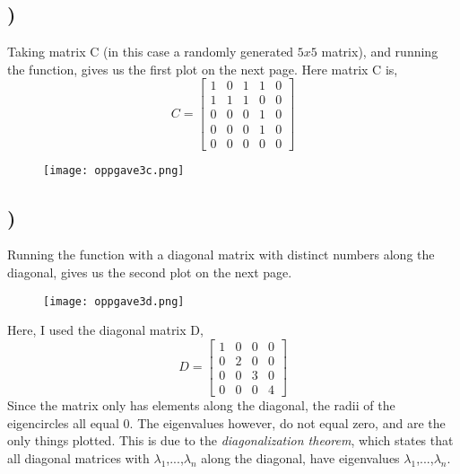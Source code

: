 \documentclass[a4paper,10pt,norsk]{article}
\begin{document}
\subsection{)}
Taking matrix C (in this case a randomly generated $5 x 5$ matrix), and running the function, gives us the first plot on the next page.
Here matrix C is,
\begin{equation}
    C =
    \begin{bmatrix}
    1 & 0 & 1 & 1 & 0\\
    1 & 1 & 1 & 0 & 0\\
    0 & 0 & 0 & 1 & 0\\
    0 & 0 & 0 & 1 & 0\\
    0 & 0 & 0 & 0 & 0
    \end{bmatrix}
\end{equation}

\begin{figure}[h!]
        \centering 
        \texttt{[image: oppgave3c.png]} 
\end{figure}

\subsection{)}
Running the function with a diagonal matrix with distinct numbers along the diagonal, gives us the second plot on the next page.

\begin{figure}[h!]
        \centering 
        \texttt{[image: oppgave3d.png]} 
\end{figure}

Here, I used the diagonal matrix D,
\begin{equation}
    D =
    \begin{bmatrix}
    1 & 0 & 0 & 0\\
    0 & 2 & 0 & 0\\
    0 & 0 & 3 & 0\\
    0 & 0 & 0 & 4
    \end{bmatrix}
\end{equation}
Since the matrix only has elements along the diagonal, the radii of the eigencircles all equal $0$. The eigenvalues however, do not equal zero, and are the only things plotted. This is due to the \emph{diagonalization theorem}, which states that all diagonal matrices with $\lambda_1$,...,$\lambda_n$ along the diagonal, have eigenvalues $\lambda_1$,...,$\lambda_n$.\\
\end{document}
